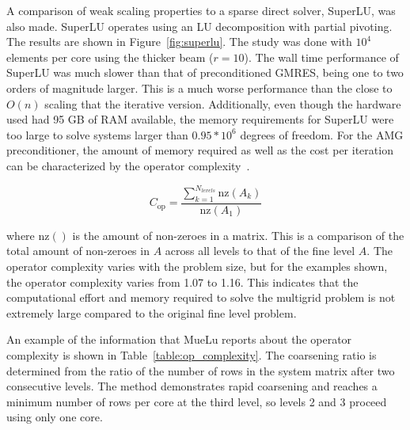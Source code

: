 A comparison of weak scaling properties to a sparse direct solver, SuperLU, was also made. SuperLU operates using an LU decomposition with partial pivoting. The results are shown in Figure~\ref{fig:superlu}. The study was done with $10^4$ elements per core using the thicker beam ($r=10$). The wall time performance of SuperLU was much slower than that of preconditioned GMRES, being one to two orders of magnitude larger. This is a much worse performance than the close to $O(n)$ scaling that the iterative version. Additionally, even though the hardware used had 95 GB of RAM available, the memory requirements for SuperLU were too large to solve systems larger than $0.95*10^6$ degrees of freedom. For the AMG preconditioner, the amount of memory required as well as the cost per iteration can be characterized by the operator complexity~\cite{Gee2009}.

\begin{equation}
    C_{\text{op}} = \frac{\displaystyle \sum_{k=1}^{N_{levels}}{\text{nz}(A_k)}}{\text{nz}(A_1)}
\end{equation}

where nz$()$ is the amount of non-zeroes in a matrix. This is a comparison of the total amount of non-zeroes in $A$ across all levels to that of the fine level $A$. The operator complexity varies with the problem size, but for the examples shown, the operator complexity varies from 1.07 to 1.16. This indicates that the computational effort and memory required to solve the multigrid problem is not extremely large compared to the original fine level problem.

An example of the information that MueLu reports about the operator complexity is shown in Table~\ref{table:op_complexity}. The coarsening ratio is determined from the ratio of the number of rows in the system matrix after two consecutive levels. The method demonstrates rapid coarsening and reaches a minimum number of rows per core at the third level, so levels 2 and 3 proceed using only one core.

